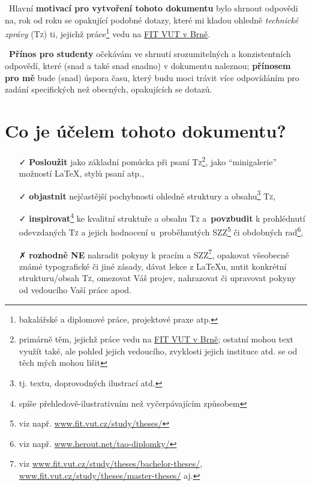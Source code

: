 \documentclass[a4paper,11pt, twoside]{report}
\begin{document}
\vspace{-4mm}

\thispagestyle{fancy}



\flushleft



\faThumbsOUp~Hlavní \textbf{motivací pro vytvoření tohoto dokumentu} bylo shrnout odpovědi na, rok od roku se opakující podobné dotazy, 
které mi kladou ohledně \emph{technické zprávy} (\textsc{Tz}) ti, jejichž práce\footnote{bakalářské a diplomové práce, projektové praxe atp.} vedu na \href{https://www.fit.vut.cz/}{FIT VUT v Brně}. 


\quad




\faThumbsOUp~\textbf{Přínos pro studenty} očekávám ve
shrnutí srozumitelných a konzistentních odpovědí, které (snad a také snad snadno) v dokumentu naleznou; \textbf{přínosem pro mě} bude (snad) úspora času, který budu moci trávit více  odpovídáním pro zadání specifických než obecných, opakujících se dotazů. 


\section*{Co je účelem tohoto dokumentu?}

\begin{itemize}
\item[\faCheck]
\textbf{Posloužit} jako základní pomůcka při psaní \textsc{Tz}\footnote{primárně těm, jejichž práce vedu na \href{https://www.fit.vut.cz/}{FIT VUT v Brně}; 
ostatní mohou text využít také, ale pohled jejich vedoucího, zvyklosti jejich instituce atd. se od těch mých mohou lišit}, jako ``minigalerie'' možností \LaTeX, stylů psaní atp.,
\item[\faCheck] 
\textbf{objastnit} nejčastější pochybnosti ohledně struktury a obsahu\footnote{tj. textu, doprovodných ilustrací atd.} \textsc{Tz},
\item[\faCheck] 
\textbf{inspirovat}\footnote{spíše přehledově-ilustrativním než vyčerpávajícím způsobem} ke kvalitní struktuře a obsahu \textsc{Tz} 
a~\textbf{povzbudit} k prohlédnutí odevzdaných \textsc{Tz} a jejich hodnocení u~proběhnutých SZZ\footnote{viz např. \url{www.fit.vut.cz/study/theses/}} 
či obdobných rad\footnote{viz např. \url{www.herout.net/tao-diplomky/}},
\item[\faClose] 
\textbf{rozhodně NE} nahradit pokyny k pracím a SZZ\footnote{viz \url{www.fit.vut.cz/study/theses/bachelor-theses/},
\url{www.fit.vut.cz/study/theses/master-theses/} aj.}, 
opakovat všeobecně známé typografické či jiné zásady,
dávat lekce z \LaTeX u,
nutit konkrétní strukturu/obsah \textsc{Tz},
omezovat Váš projev,
nahrazovat či upravovat pokyny od vedoucího Vaší práce
apod.
\end{itemize}
\end{document}
